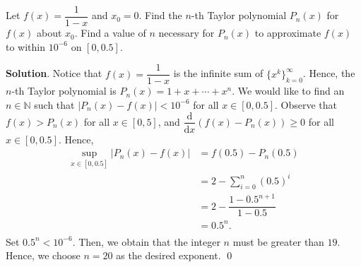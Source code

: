 \documentclass[11pt]{article}
\theoremstyle{break}
\newcommand{\dd}{\text{d}}
\numberwithin{equation}{theorem}
\begin{document}
\newpage
\begin{problem}\label{problem 4}
    Let $f(x)=\dfrac{1}{1-x}$ and $x_0=0$. Find the $n$-th Taylor polynomial $P_n(x)$ for $f(x)$ about $x_0$. Find a value of $n$ necessary for $P_n(x)$ to approximate $f(x)$ to within $10^{-6}$ on $[0, 0.5]$.
\end{problem}
\textbf{Solution}. Notice that $f(x)=\dfrac{1}{1-x}$ is the infinite sum of $\{x^k\}_{k=0}^\infty$. Hence, the $n$-th Taylor polynomial is $\displaystyle P_n(x)=1+x+\cdots+x^n$. We would like to find an $n\in\mathbb{N}$ such that $|P_n(x)-f(x)|<10^{-6}$ for all $x\in[0, 0.5]$. Observe that $f(x)>P_n(x)$ for all $x\in[0, 5]$, and $\dfrac{\dd}{\dd x}\left(f(x)-P_n(x)\right)\geq 0$ for all $x\in[0, 0.5]$. Hence, \vspace{-0.6em}
\begin{align*}
    \sup_{x\in[0, 0.5]}|P_n(x)-f(x)|&=f(0.5)-P_n(0.5)\\
    &=2-\sum_{i=0}^{n}(0.5)^i\\
    &=2-\dfrac{1-0.5^{n+1}}{1-0.5}\\
    &=0.5^n.\\[-3.4em]
\end{align*}
Set $0.5^n<10^{-6}$. Then, we obtain that the integer $n$ must be greater than $19$. Hence, we choose $n=20$ as the desired exponent. \qed
\end{document}

